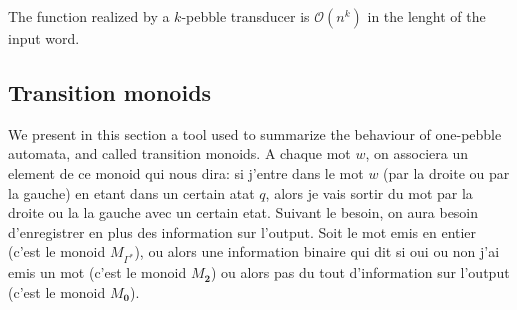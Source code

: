 \begin{proposition}
The function realized by a $k$-pebble transducer is $\mathcal{O}(n^k)$ in the lenght of the input word.
\end{proposition}

\subsection{Transition monoids}
We present in this section a tool used to summarize the behaviour of one-pebble automata, and called transition monoids. A chaque mot $w$, on associera un element de ce monoid qui nous dira: si j'entre dans le mot $w$ (par la droite ou par la gauche) en etant dans un certain atat $q$, alors je vais sortir du mot par la droite ou la  la gauche avec un certain etat. Suivant le besoin, on aura besoin d'enregistrer en plus des information sur l'output. Soit le mot emis en entier (c'est le monoid $M_{\Gamma^*}$), ou alors une information binaire qui dit si oui ou non j'ai emis un mot (c'est le monoid $M_{\mathbf{2}}$) ou alors pas du tout d'information sur l'output (c'est le monoid $M_{\mathbf{0}}$).

